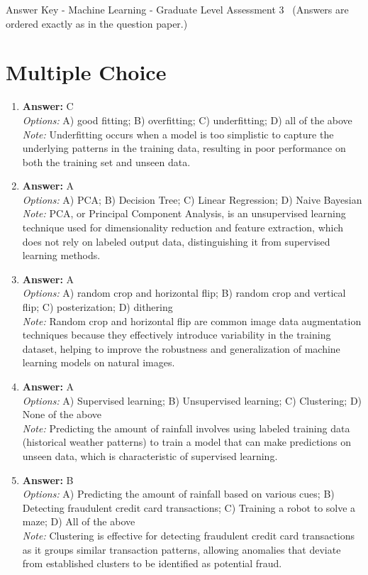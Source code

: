 \documentclass[12pt]{article}
\begin{document}
\begin{center}
Answer Key - Machine Learning - Graduate Level Assessment 3 \
\small (Answers are ordered exactly as in the question paper.)
\end{center}

\section*{Multiple Choice}
\begin{enumerate}[label=\arabic*.]
\item \textbf{Answer:} C
\\ \textit{Options:} A) good fitting; B) overfitting; C) underfitting; D) all of the above
\\ \textit{Note:} Underfitting occurs when a model is too simplistic to capture the underlying patterns in the training data, resulting in poor performance on both the training set and unseen data.
\item \textbf{Answer:} A
\\ \textit{Options:} A) PCA; B) Decision Tree; C) Linear Regression; D) Naive Bayesian
\\ \textit{Note:} PCA, or Principal Component Analysis, is an unsupervised learning technique used for dimensionality reduction and feature extraction, which does not rely on labeled output data, distinguishing it from supervised learning methods.
\item \textbf{Answer:} A
\\ \textit{Options:} A) random crop and horizontal flip; B) random crop and vertical flip; C) posterization; D) dithering
\\ \textit{Note:} Random crop and horizontal flip are common image data augmentation techniques because they effectively introduce variability in the training dataset, helping to improve the robustness and generalization of machine learning models on natural images.
\item \textbf{Answer:} A
\\ \textit{Options:} A) Supervised learning; B) Unsupervised learning; C) Clustering; D) None of the above
\\ \textit{Note:} Predicting the amount of rainfall involves using labeled training data (historical weather patterns) to train a model that can make predictions on unseen data, which is characteristic of supervised learning.
\item \textbf{Answer:} B
\\ \textit{Options:} A) Predicting the amount of rainfall based on various cues; B) Detecting fraudulent credit card transactions; C) Training a robot to solve a maze; D) All of the above
\\ \textit{Note:} Clustering is effective for detecting fraudulent credit card transactions as it groups similar transaction patterns, allowing anomalies that deviate from established clusters to be identified as potential fraud.
\end{enumerate}
\end{document}
